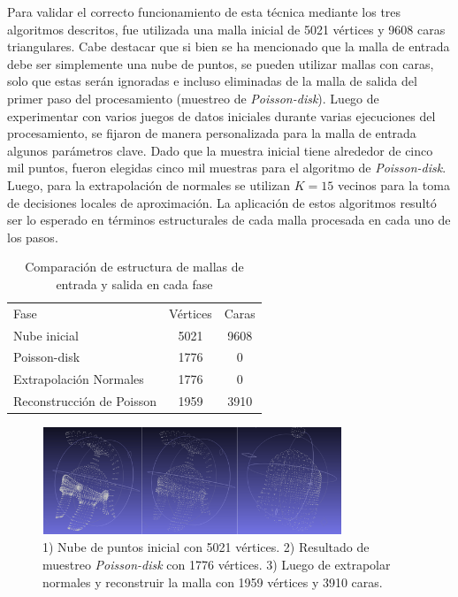 Para validar el correcto funcionamiento de esta técnica mediante los tres algoritmos descritos, fue utilizada una malla inicial de 5021 vértices y 9608 caras triangulares. Cabe destacar que si bien se ha mencionado que la malla de entrada debe ser simplemente una nube de puntos, se pueden utilizar mallas con caras, solo que estas serán ignoradas e incluso eliminadas de la malla de salida del primer paso del procesamiento (muestreo de \emph{Poisson-disk}).
Luego de experimentar con varios juegos de datos iniciales durante varias ejecuciones del procesamiento, se fijaron de manera personalizada para la malla de entrada algunos parámetros clave. Dado que la muestra inicial tiene alrededor de cinco mil puntos, fueron elegidas cinco mil muestras para el algoritmo de \emph{Poisson-disk}. Luego, para la extrapolación de normales se utilizan $K=15$ vecinos para la toma de decisiones locales de aproximación.
La aplicación de estos algoritmos resultó ser lo esperado en términos estructurales de cada malla procesada en cada uno de los pasos.

\begin{table}
\begin{center}
\begin{tabular}{|l||cc|} \hline
  Fase & Vértices & Caras \\
  Nube inicial & 5021 & 9608 \\
  Poisson-disk & 1776 & 0 \\
  Extrapolación Normales & 1776 & 0 \\
  Reconstrucción de Poisson & 1959 & 3910 \\ \hline %
\end{tabular}
\caption{Comparación de estructura de mallas de entrada y salida en cada fase}
\end{center}
\end{table}

\begin{figure}[H]
  \centering
    \includegraphics[width=0.8\textwidth]{./Cap2_videomapping/malla-nubepuntos.png}
  \caption{1) Nube de puntos inicial con 5021 vértices. 2) Resultado de muestreo \emph{Poisson-disk} con 1776 vértices. 3) Luego de extrapolar normales y reconstruir la malla con 1959 vértices y 3910 caras.}
  \label{fig:Mesh-Results}
\end{figure}
 
